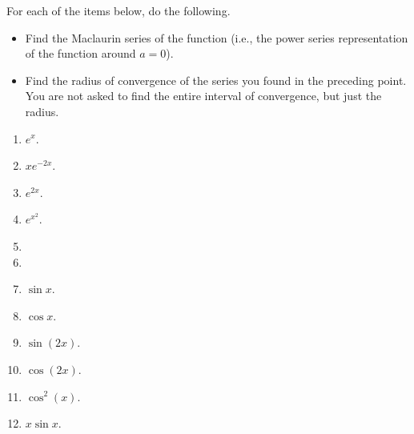 For each of the items below, do the following.
\begin{itemize}
\item Find the Maclaurin series of the function (i.e., the power series representation of the function around $a=0$).
\item Find the radius of convergence of the series you found in the preceding point. You are not asked to find the entire interval of convergence, but just the radius.
\end{itemize}
\begin{multicols}{2}
\begin{enumerate}
\item $e^x$.

\item $x e^{-2x}$.


\item $e^{2x}$.


\item $e^{x^2}$.

\item 
\item 
\item $\sin x$.

\item $\cos x$.

\item $\sin (2x)$.

\item $\cos (2x)$.

\item $\cos^2 (x)$.


\item $x\sin x$.


\end{enumerate}
\end{multicols}